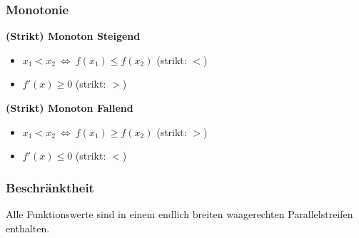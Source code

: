         \subsubsection{Monotonie}
            \textbf{(Strikt) Monoton Steigend}
                \begin{itemize}
                    \item $x_1 < x_2\ \Longleftrightarrow\ f(x_1) \leq f(x_2)$ \hfill (strikt: $<$)
                    \item $f'(x) \geq 0$ \hfill (strikt: $>$)
                \end{itemize}
            \textbf{(Strikt) Monoton Fallend}
                \begin{itemize}
                    \item $x_1 < x_2\ \Longleftrightarrow\ f(x_1) \geq f(x_2)$ \hfill (strikt: $>$)
                    \item $f'(x) \leq 0$ \hfill (strikt: $<$)
                \end{itemize}
        \subsubsection{Beschränktheit}
            Alle Funktionswerte sind in einem endlich breiten waagerechten Parallelstreifen enthalten.